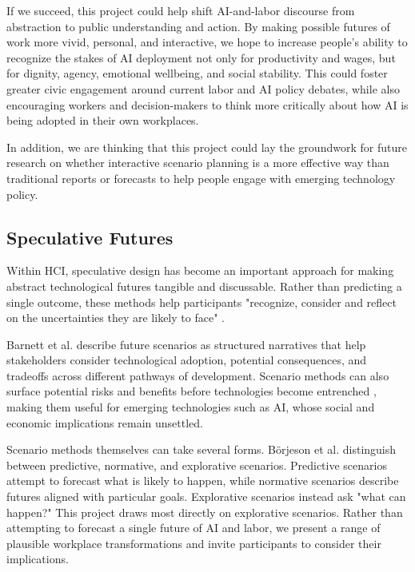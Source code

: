 \documentclass[sigconf,authordraft]{acmart}
\begin{document}
If we succeed, this project could help shift AI-and-labor discourse from abstraction to public understanding and action. By making possible futures of work more vivid, personal, and interactive, we hope to increase people’s ability to recognize the stakes of AI deployment not only for productivity and wages, but for dignity, agency, emotional wellbeing, and social stability. This could foster greater civic engagement around current labor and AI policy debates, while also encouraging workers and decision-makers to think more critically about how AI is being adopted in their own workplaces. 

In addition, we are thinking that this project could lay the groundwork for future research on whether interactive scenario planning is a more effective way than traditional reports or forecasts to help people engage with emerging technology policy.

\subsection{\textbf{Speculative Futures}}

Within HCI, speculative design has become an important approach for making abstract technological futures tangible and discussable. Rather than predicting a single outcome, these methods help participants "recognize, consider and reflect on the uncertainties they are likely to face" \cite{varum2010scenarios}.

Barnett et al. \cite{barnett2025scenarios} describe future scenarios as structured narratives that help stakeholders consider technological adoption, potential consequences, and tradeoffs across different pathways of development. Scenario methods can also surface potential risks and benefits before technologies become entrenched \cite{brey2017ethics}, making them useful for emerging technologies such as AI, whose social and economic implications remain unsettled.

Scenario methods themselves can take several forms. Börjeson et al. \cite{borjeson2006scenario} distinguish between predictive, normative, and explorative scenarios. Predictive scenarios attempt to forecast what is likely to happen, while normative scenarios describe futures aligned with particular goals. Explorative scenarios instead ask "what can happen?" This project draws most directly on explorative scenarios. Rather than attempting to forecast a single future of AI and labor, we present a range of plausible workplace transformations and invite participants to consider their implications.
\end{document}
